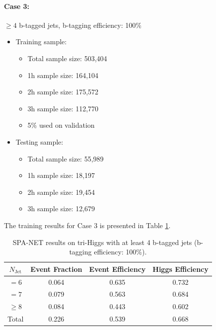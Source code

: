 \documentclass[12pt]{article}
\begin{document}
		\paragraph{Case 3:} $\ge 4$ b-tagged jets, b-tagging efficiency: 100\% 
		\begin{itemize}
			\item Training sample:
			\begin{itemize}
				\item Total sample size: 503,404
				\item 1h sample size: 164,104
				\item 2h sample size: 175,572
				\item 3h sample size: 112,770
				\item 5\% used on validation
			\end{itemize}
			\item Testing sample: 
				\begin{itemize}
					\item Total sample size: 55,989
					\item 1h sample size: 18,197
					\item 2h sample size: 19,454
					\item 3h sample size: 12,679
				\end{itemize}
		\end{itemize}
		The training results for Case 3 is presented in Table \ref{tab:SPANet_triHiggs_4btag_100}.
		\begin{table}[htpb]
			\centering
			\caption{SPA-NET results on tri-Higgs with at least 4 b-tagged jets (b-tagging efficiency: 100\%).}
			\label{tab:SPANet_triHiggs_4btag_100}
			\begin{tabular}{c|c|cc}
				$N_\text{Jet}$ & Event Fraction & Event Efficiency & Higgs Efficiency \\
				\hline
				$=6$	  &   0.064             &    0.635              &    0.732             \\
				$=7$	  &   0.079             &    0.563              &    0.684             \\
				$\ge 8$	  &   0.084             &    0.443              &    0.602             \\
				Total	  &   0.226             &    0.539              &    0.668             \\
			\end{tabular}
		\end{table}
\end{document}
